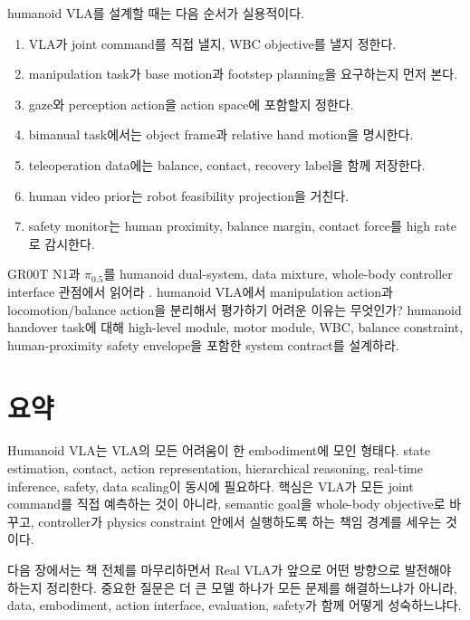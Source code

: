 humanoid VLA를 설계할 때는 다음 순서가 실용적이다.
\begin{enumerate}
  \item VLA가 joint command를 직접 낼지, WBC objective를 낼지 정한다.
  \item manipulation task가 base motion과 footstep planning을 요구하는지 먼저 본다.
  \item gaze와 perception action을 action space에 포함할지 정한다.
  \item bimanual task에서는 object frame과 relative hand motion을 명시한다.
  \item teleoperation data에는 balance, contact, recovery label을 함께 저장한다.
  \item human video prior는 robot feasibility projection을 거친다.
  \item safety monitor는 human proximity, balance margin, contact force를 high rate로 감시한다.
\end{enumerate}

\chapterwork
{GR00T N1과 $\pi_{0.5}$를 humanoid dual-system, data mixture, whole-body controller interface 관점에서 읽어라 \cite{grootn12025,pi052025}.}
{humanoid VLA에서 manipulation action과 locomotion/balance action을 분리해서 평가하기 어려운 이유는 무엇인가?}
{humanoid handover task에 대해 high-level module, motor module, WBC, balance constraint, human-proximity safety envelope을 포함한 system contract를 설계하라.}

\section{요약}

Humanoid VLA는 VLA의 모든 어려움이 한 embodiment에 모인 형태다. state estimation, contact, action representation, hierarchical reasoning, real-time inference, safety, data scaling이 동시에 필요하다. 핵심은 VLA가 모든 joint command를 직접 예측하는 것이 아니라, semantic goal을 whole-body objective로 바꾸고, controller가 physics constraint 안에서 실행하도록 하는 책임 경계를 세우는 것이다.

다음 장에서는 책 전체를 마무리하면서 Real VLA가 앞으로 어떤 방향으로 발전해야 하는지 정리한다. 중요한 질문은 더 큰 모델 하나가 모든 문제를 해결하느냐가 아니라, data, embodiment, action interface, evaluation, safety가 함께 어떻게 성숙하느냐다.
